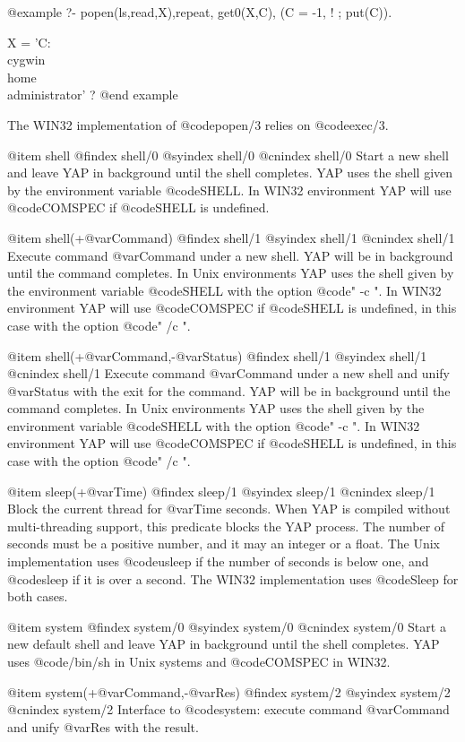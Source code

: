{{{{{{{{@example
   ?- popen(ls,read,X),repeat, get0(X,C), (C = -1, ! ; put(C)).

X = 'C:\\cygwin\\home\\administrator' ?
@end example


The WIN32 implementation of @code{popen/3} relies on @code{exec/3}.

@item shell
@findex  shell/0
@syindex shell/0
@cnindex shell/0
Start a new shell and leave YAP in background until the shell
completes. YAP uses the shell given by the environment variable
@code{SHELL}. In WIN32 environment YAP will use @code{COMSPEC} if
@code{SHELL} is undefined.

@item shell(+@var{Command})
@findex  shell/1
@syindex shell/1
@cnindex shell/1
Execute command @var{Command} under a new shell. YAP will be in
background until the command completes. In Unix environments YAP uses
the shell given by the environment variable @code{SHELL} with the option
@code{" -c "}. In WIN32 environment YAP will use @code{COMSPEC} if
@code{SHELL} is undefined, in this case with the option @code{" /c "}.

@item shell(+@var{Command},-@var{Status})
@findex  shell/1
@syindex shell/1
@cnindex shell/1
Execute command @var{Command} under a new shell and unify @var{Status}
with the exit for the command. YAP will be in background until the
command completes. In Unix environments YAP uses the shell given by the
environment variable @code{SHELL} with the option @code{" -c "}. In
WIN32 environment YAP will use @code{COMSPEC} if @code{SHELL} is
undefined, in this case with the option @code{" /c "}.

@item sleep(+@var{Time})
@findex  sleep/1
@syindex sleep/1
@cnindex sleep/1
Block the current thread for @var{Time} seconds. When YAP is compiled 
without multi-threading support, this predicate blocks the YAP process. 
The number of seconds must be a positive number, and it may an integer 
or a float. The Unix implementation uses @code{usleep} if the number of 
seconds is below one, and @code{sleep} if it is over a second. The WIN32 
implementation uses @code{Sleep} for both cases.

@item system
@findex  system/0
@syindex system/0
@cnindex system/0
Start a new default shell and leave YAP in background until the shell
completes. YAP uses @code{/bin/sh} in Unix systems and @code{COMSPEC} in
WIN32.

@item system(+@var{Command},-@var{Res})
@findex  system/2
@syindex system/2
@cnindex system/2
Interface to @code{system}: execute command @var{Command} and unify
@var{Res} with the result.

}}}}}}}}
